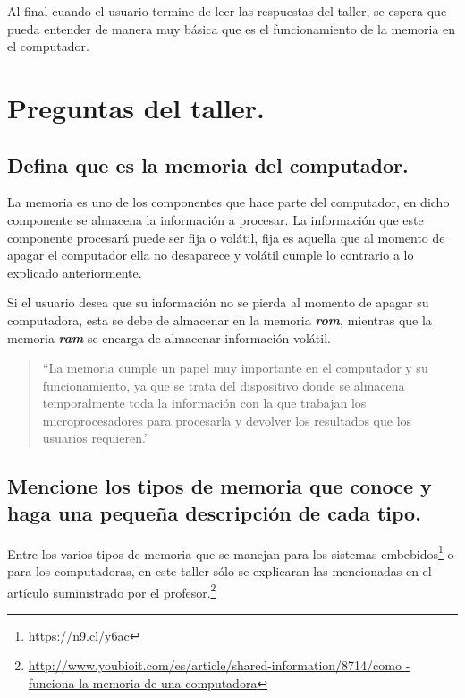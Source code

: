 \documentclass[12pt,letterpaper]{article}
\begin{document}
Al final cuando el usuario termine de leer las respuestas del taller, se espera que pueda entender de manera muy básica que es el funcionamiento de la memoria en el computador.\\


\newpage


\section{Preguntas del taller.}\label{preguntas}
    \subsection{Defina que es la memoria del computador.}

La memoria es uno de los componentes que hace parte del computador, en dicho componente se almacena la información a procesar. La información que este componente procesará puede ser fija o volátil, fija es aquella que al momento de apagar el computador ella no desaparece y volátil cumple lo contrario a lo explicado anteriormente.

Si el usuario desea que su información no se pierda al momento de apagar su computadora, esta se debe de almacenar en la memoria \textbf{\emph{rom}}, mientras que la memoria \textbf{\textit{ram}} se encarga de almacenar información volátil.


        \begin{quote}
            ``La memoria cumple un papel muy importante en el computador y su funcionamiento, ya que se
            trata del dispositivo donde se almacena temporalmente toda la información con la que trabajan
            los microprocesadores para procesarla y devolver los resultados que los usuarios requieren.''\cite{GuiaProfesor}
        \end{quote}

    \subsection{Mencione los tipos de memoria que conoce y haga una pequeña descripción de cada tipo.}

Entre los varios tipos de memoria que se manejan para los sistemas embebidos\footnote{\url{https://n9.cl/y6ac}} o para los computadoras, en este taller sólo se explicaran las mencionadas en el artículo suministrado por el profesor.\footnote{\url{http://www.youbioit.com/es/article/shared-information/8714/como
-funciona-la-memoria-de-una-computadora}}
\end{document}
